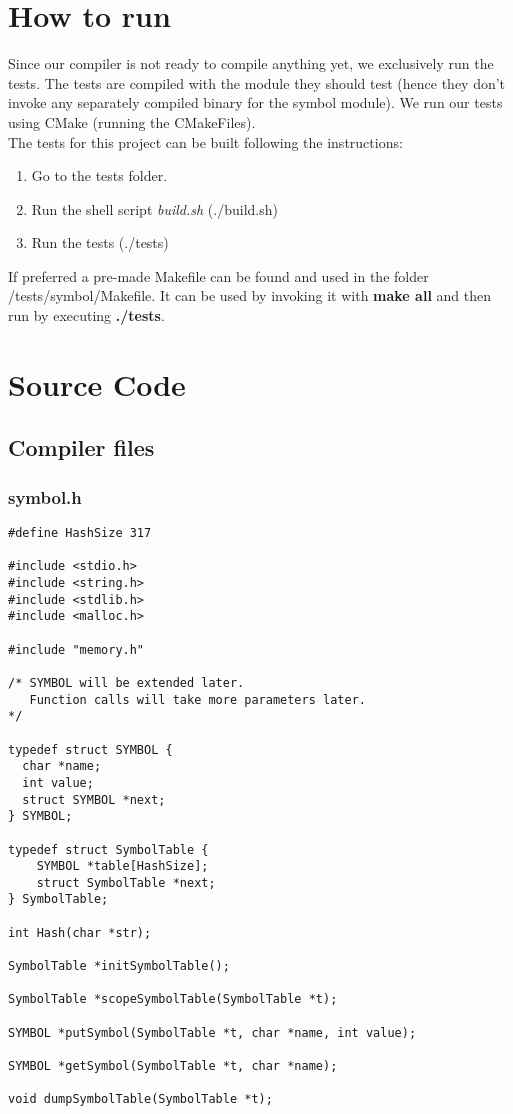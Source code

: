 \documentclass[a4paper]{article}
\begin{document}
\section{How to run}
Since our compiler is not ready to compile anything yet, we exclusively run the tests.
The tests are compiled with the module they should test (hence they don't invoke any separately compiled binary for the symbol module).
We run our tests using CMake (running the CMakeFiles).\\
The tests for this project can be built following the instructions:
\begin{enumerate}
    \item Go to the tests folder.
    \item Run the shell script \textit{build.sh} (./build.sh)
    \item Run the tests (./tests)
\end{enumerate}
If preferred a pre-made Makefile can be found and used in the folder /tests/symbol/Makefile. It can be used by invoking it with \textbf{make all} and then run by executing \textbf{./tests}.


\newpage
\section{Source Code}
\subsection{Compiler files}
\subsubsection{symbol.h}
\begin{verbatim}
#define HashSize 317

#include <stdio.h>
#include <string.h>
#include <stdlib.h>
#include <malloc.h>

#include "memory.h"

/* SYMBOL will be extended later.
   Function calls will take more parameters later.
*/

typedef struct SYMBOL {
  char *name;
  int value;
  struct SYMBOL *next;
} SYMBOL;

typedef struct SymbolTable {
    SYMBOL *table[HashSize];
    struct SymbolTable *next;
} SymbolTable;

int Hash(char *str);

SymbolTable *initSymbolTable();

SymbolTable *scopeSymbolTable(SymbolTable *t);

SYMBOL *putSymbol(SymbolTable *t, char *name, int value);

SYMBOL *getSymbol(SymbolTable *t, char *name);

void dumpSymbolTable(SymbolTable *t);
\end{verbatim}
\end{document}

